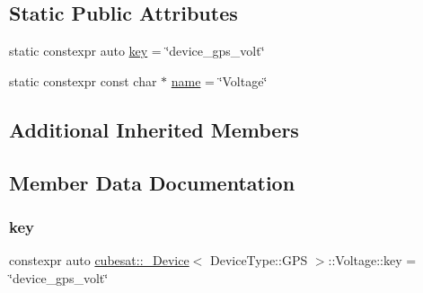 \subsection*{Static Public Attributes}
\begin{DoxyCompactItemize}
\item 
static constexpr auto \hyperlink{structcubesat_1_1__Device_3_01DeviceType_1_1GPS_01_4_1_1Voltage_a837dda10fa9fe2c493cee0f356c1c3c8}{key} = \char`\"{}device\+\_\+gps\+\_\+volt\char`\"{}
\item 
static constexpr const char $\ast$ \hyperlink{structcubesat_1_1__Device_3_01DeviceType_1_1GPS_01_4_1_1Voltage_afdac5b3afd27f5a5ca97d971f8fb8333}{name} = \char`\"{}Voltage\char`\"{}
\end{DoxyCompactItemize}
\subsection*{Additional Inherited Members}


\subsection{Member Data Documentation}
\mbox{\label{structcubesat_1_1__Device_3_01DeviceType_1_1GPS_01_4_1_1Voltage_a837dda10fa9fe2c493cee0f356c1c3c8}} 
\subsubsection{\texorpdfstring{key}{key}}
{\footnotesize\ttfamily constexpr auto \hyperlink{structcubesat_1_1__Device}{cubesat\+::\+\_\+\+Device}$<$ Device\+Type\+::\+G\+PS $>$\+::Voltage\+::key = \char`\"{}device\+\_\+gps\+\_\+volt\char`\"{}\hspace{0.3cm}{\ttfamily [static]}}

\mbox{\label{structcubesat_1_1__Device_3_01DeviceType_1_1GPS_01_4_1_1Voltage_afdac5b3afd27f5a5ca97d971f8fb8333}} 
